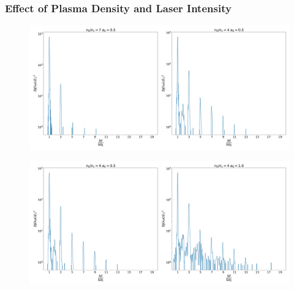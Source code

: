 \documentclass{beamer}
\begin{document}
\begin{frame}
    \frametitle{Effect of Plasma Density and Laser Intensity}
    \begin{figure}
        \centering
        \includegraphics[width=1.0\textwidth, height=0.4\textheight]{images/density.jpg}
        \label{fig:PlasmaDensity}
    \end{figure}
    \begin{figure}
        \centering
        \includegraphics[width=1.0\textwidth, height=0.4\textheight]{images/intensity.jpg}
        \label{fig:LaserIntensity}
    \end{figure}
\end{frame}
\end{document}

